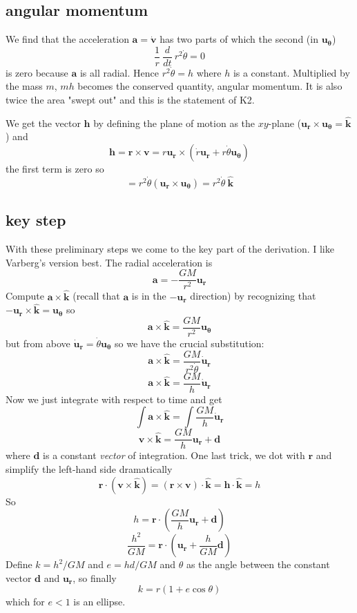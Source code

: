 \documentclass[11pt, oneside]{article}
\begin{document}
\subsection*{angular momentum}
We find that the acceleration $\mathbf{a} = \dot{\mathbf{v}}$ has two parts of which the second (in $\mathbf{u_{\theta}}$)
\[ \frac{1}{r} \ \frac{d}{dt} \ r^2 \dot{\theta} = 0 \]
 is zero because $\mathbf{a}$ is all radial.  Hence $r^2 \dot{\theta} = h$ where $h$ is a constant.  Multiplied by the mass $m$, $mh$ becomes the conserved quantity, angular momentum.  It is also twice the area "swept out" and this is the statement of K2.

We get the vector $\mathbf{h}$ by defining the plane of motion as the $xy$-plane ($\mathbf{u_r} \times \mathbf{u_{\theta}} = \hat{\mathbf{k}}$) and
\[ \mathbf{h} = \mathbf{r} \times \mathbf{v} = r \mathbf{u_r} \times (\dot{r} \mathbf{u_r} +  r \dot{\theta}  \mathbf{u_{\theta}}) \]
the first term is zero so
\[ = r^2  \dot{\theta} ( \mathbf{u_r} \times \mathbf{u_{\theta}} ) = r^2  \dot{\theta}  \ \hat{\mathbf{k}} \]

\subsection*{key step}

With these preliminary steps we come to the key part of the derivation.  I like Varberg's version best.  The radial acceleration is
\[ \mathbf{a} = -\frac{GM}{r^2} \mathbf{u_r} \]
Compute $\mathbf{a} \times \hat{\mathbf{k}}$ (recall that $\mathbf{a}$ is in the $-\mathbf{u_r}$ direction) by recognizing that $-\mathbf{u_r} \times \hat{\mathbf{k}} = \mathbf{u_{\theta}}$ so
\[ \mathbf{a} \times \hat{\mathbf{k}} = \frac{GM}{r^2} \mathbf{u_{\theta}} \]
but from above $\dot{\mathbf{u}}_\mathbf{r} = \dot{\theta} \mathbf{u_{\theta}}$ so we have the crucial substitution:
\[ \mathbf{a} \times \hat{\mathbf{k}} = \frac{GM}{r^2 \dot{\theta} } \dot{\mathbf{u}}_\mathbf{r} \]
\[ \mathbf{a} \times \hat{\mathbf{k}} = \frac{GM}{h} \dot{\mathbf{u}}_\mathbf{r} \]
Now we just integrate with respect to time and get
\[ \int \mathbf{a} \times \hat{\mathbf{k}} = \int \frac{GM}{h} \dot{\mathbf{u}}_\mathbf{r}  \]
\[ \mathbf{v} \times \hat{\mathbf{k}} = \frac{GM}{h} \mathbf{u}_\mathbf{r} + \mathbf{d} \]
where $\mathbf{d}$ is a constant \emph{vector} of integration.
One last trick, we dot with $\mathbf{r}$ and simplify the left-hand side dramatically
\[ \mathbf{r} \cdot ( \mathbf{v} \times \hat{\mathbf{k}}) = (\mathbf{r} \times \mathbf{v}) \cdot  \hat{\mathbf{k}} = \mathbf{h} \cdot \hat{\mathbf{k}} = h \]
So
\[ h = \mathbf{r} \cdot (\frac{GM}{h} \mathbf{u}_\mathbf{r} + \mathbf{d}) \]
\[ \frac{h^2}{GM} = \mathbf{r} \cdot (\mathbf{u}_\mathbf{r} + \frac{h}{GM} \mathbf{d} ) \]
Define $k = h^2/GM$ and $e = hd/GM$ and $\theta$ as the angle between the constant vector $\mathbf{d}$ and $\mathbf{u}_\mathbf{r}$, so finally
\[ k = r (1 + e \cos \theta) \]
which for $e < 1$ is an ellipse.
\end{document}
